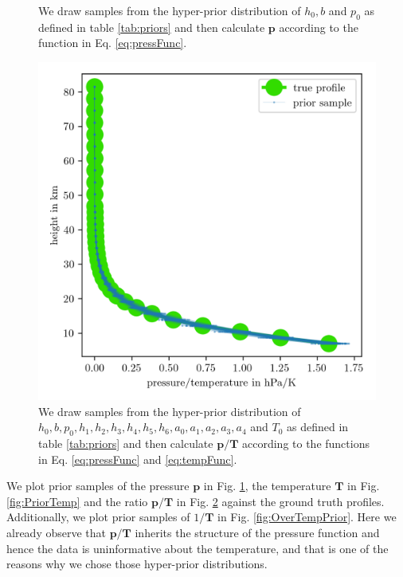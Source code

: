 \begin{figure}[ht!]
	\centering
	
	\caption[Prior Samples of $\bm{p}$ according to the respective hyper-prior distribution.]{We draw samples from the hyper-prior distribution of $h_0, b$ and $p_0$ as defined in table \ref{tab:priors} and then calculate $\bm{p}$ according to the function in Eq. \ref{eq:pressFunc}.}
	\label{fig:PriorPress}
\end{figure}
\begin{figure}[ht!]
	\centering
	\includegraphics{PriorTempOverPostMeanSigm.png}
	\caption[Prior Samples of $\bm{p}/\bm{T}$ according to the respective hyper-prior distribution.]{We draw samples from the hyper-prior distribution of $h_0, b, p_0, h_1, h_2,h_3,h_4,h_5,h_6, a_0, a_1, a_2,a_3,a_4$ and $T_0$ as defined in table \ref{tab:priors} and then calculate $\bm{p}/\bm{T}$ according to the functions in Eq. \ref{eq:pressFunc} and \ref{eq:tempFunc}.}
	\label{fig:PriorPressOverTemp}
\end{figure}
We plot prior samples of the pressure $\bm{p}$ in Fig. \ref{fig:PriorPress}, the temperature $\bm{T}$ in Fig. \ref{fig:PriorTemp} and the ratio $\bm{p}/\bm{T}$ in Fig. \ref{fig:PriorPressOverTemp} against the ground truth profiles.
Additionally, we plot prior samples of $1/\bm{T}$ in Fig. \ref{fig:OverTempPrior}.
Here we already observe that $\bm{p}/\bm{T}$ inherits the structure of the pressure function and hence the data is uninformative about the temperature, and that is one of the reasons why we chose those hyper-prior distributions.
\clearpage
